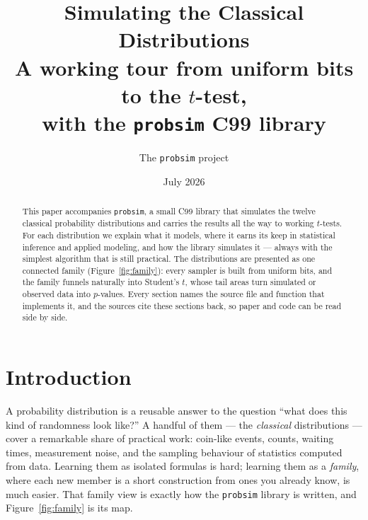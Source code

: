 \documentclass[11pt]{article}
\title{\textbf{Simulating the Classical Distributions}\\[2pt]
       \large A working tour from uniform bits to the $t$-test,\\
       with the \texttt{probsim} C99 library}
\author{The \texttt{probsim} project}
\date{July 2026}
\numberwithin{equation}{section}
\begin{document}
\maketitle

\begin{abstract}
\noindent
This paper accompanies \texttt{probsim}, a small C99 library that simulates
the twelve classical probability distributions and carries the results all
the way to working $t$-tests.  For each distribution we explain what it
models, where it earns its keep in statistical inference and applied
modeling, and how the library simulates it --- always with the simplest
algorithm that is still practical.  The distributions are presented as one
connected family (Figure~\ref{fig:family}): every sampler is built from
uniform bits, and the family funnels naturally into Student's $t$, whose
tail areas turn simulated or observed data into $p$-values.  Every section
names the source file and function that implements it, and the sources cite
these sections back, so paper and code can be read side by side.
\end{abstract}

\section{Introduction}\label{sec:intro}

A probability distribution is a reusable answer to the question ``what does
this kind of randomness look like?''  A handful of them --- the
\emph{classical} distributions --- cover a remarkable share of practical
work: coin-like events, counts, waiting times, measurement noise, and the
sampling behaviour of statistics computed from data.  Learning them as
isolated formulas is hard; learning them as a \emph{family}, where each new
member is a short construction from ones you already know, is much easier.
That family view is exactly how the \texttt{probsim} library is written,
and Figure~\ref{fig:family} is its map.
\end{document}
